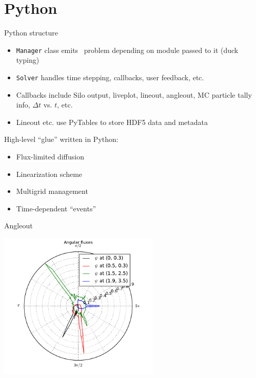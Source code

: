 \documentclass{beamer}
\begin{document}
\section{Python}
\begin{frame}[fragile]{Python structure}
  \begin{itemize}
    \item \verb|Manager| class emits \cpp\ problem depending on module passed
      to it (duck typing)
    \item \verb|Solver| handles time stepping, callbacks, user feedback, etc.
    \item Callbacks include Silo output, liveplot, lineout, angleout, MC
      particle tally info, $\Delta t$ vs. $t$, etc.
    \item Lineout etc. use PyTables to store HDF5 data and metadata
  \end{itemize}

  High-level ``glue'' written in Python:
  \begin{itemize}
    \item Flux-limited diffusion
    \item Linearization scheme
    \item Multigrid management
    \item Time-dependent ``events''
  \end{itemize}
\end{frame}

\begin{frame}{Angleout}

{\centering\includegraphics[height=2.75in]{angleout}\par}
\end{frame}

\end{document}
